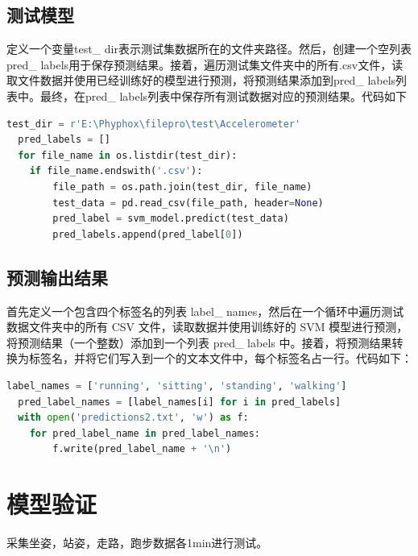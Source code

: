 \documentclass[UTF8]{ctexart}
\begin{document}
\subsection{测试模型}
定义一个变量test\_ dir表示测试集数据所在的文件夹路径。然后，创建一个空列表pred\_ labels用于保存预测结果。接着，遍历测试集文件夹中的所有.csv文件，读取文件数据并使用已经训练好的模型进行预测，将预测结果添加到pred\_ labels列表中。最终，在pred\_ labels列表中保存所有测试数据对应的预测结果。代码如下\\
\begin{lstlisting}[language=python, basicstyle=\ttfamily]
  test_dir = r'E:\Phyphox\filepro\test\Accelerometer'
  pred_labels = []
  for file_name in os.listdir(test_dir):
    if file_name.endswith('.csv'):
        file_path = os.path.join(test_dir, file_name)
        test_data = pd.read_csv(file_path, header=None)
        pred_label = svm_model.predict(test_data)
        pred_labels.append(pred_label[0])
\end{lstlisting}

\subsection{预测输出结果}
首先定义一个包含四个标签名的列表 label\_ names，然后在一个循环中遍历测试数据文件夹中的所有 CSV 文件，读取数据并使用训练好的 SVM 模型进行预测，将预测结果（一个整数）添加到一个列表 pred\_ labels 中。接着，将预测结果转换为标签名，并将它们写入到一个的文本文件中，每个标签名占一行。代码如下：\\
\begin{lstlisting}[language=python, basicstyle=\ttfamily]
  label_names = ['running', 'sitting', 'standing', 'walking']
  pred_label_names = [label_names[i] for i in pred_labels]
  with open('predictions2.txt', 'w') as f:
    for pred_label_name in pred_label_names:
        f.write(pred_label_name + '\n')
\end{lstlisting}

\section{模型验证}
采集坐姿，站姿，走路，跑步数据各1min进行测试。
\end{document}
